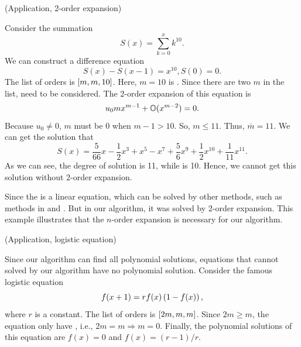 \begin{example}
(Application, 2-order expansion)

Consider the summation 
\begin{equation}
    S(x)=\sum_{k=0}^x{k^{10}}.
\end{equation}
We can construct a difference equation  
\begin{equation}
    S(x)-S(x-1)=x^{10}, S(0)=0. \label{seq}
\end{equation}
The list of orders is $\left[m,m,10\right]$. Here, $m=10$ is \BPone{}. Since there are two $m$ in the list, \BPthree{} need to be considered. The 2-order expansion of this equation is 
\begin{equation}
u_0m x^{m-1}+\mathbb O(x^{m-2})=0.   
\end{equation}
Because $u_0\neq 0$, $m$ must be 0 when $m-1>10$. So, $m\le 11$. Thus, $\overline m=11$. We can get the solution that
\begin{equation}
S(x)=\frac{5}{66}x-\frac{1}{2}x^3+x^5-x^7+\frac{5}{6}x^9+\frac{1}{2}x^{10}+\frac{1}{11}x^{11}.
\end{equation}
As we can see, the degree of solution is 11, while \BPone{} is 10. Hence, we cannot get this solution without 2-order expansion. 

Since the  is a linear equation, which can be solved by other methods, such as methods in \cite{Abramov1989polynomial} and \cite{Abramov1995polynomial}. But in our algorithm, it was solved by 2-order expansion. This example illustrates that the $n$-order expansion is necessary for our algorithm. 
\end{example}

\begin{example}
(Application, logistic equation)

Since our algorithm can find all polynomial solutions, equations that cannot solved by our algorithm have no polynomial solution. Consider the famous logistic equation\citep{may1976simple}
\begin{equation}
    f(x+1)=r f(x)\left(1-f(x)\right),
\end{equation}
where $r$ is a constant. The list of orders is $\left[2m,m,m\right]$. Since $2m\ge m$, the equation only have \BPone{}, i.e., $2m=m\Rightarrow m=0$. Finally, the polynomial solutions of this equation are $f(x)=0$ and $f(x)=(r-1)/r$.
\end{example}

